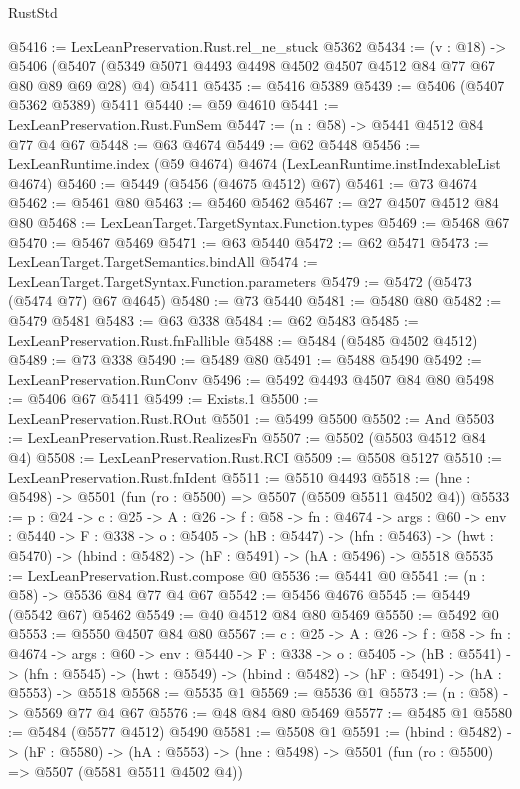 \begin{lexlean}{RustStd}
\begin{coremodule}
@5416 := LexLeanPreservation.Rust.rel_ne_stuck @5362
@5434 := (v : @18) ->
  @5406 (@5407 (@5349 @5071 @4493 @4498 @4502 @4507 @4512 @84 @77 @67 @80 @89 @69 @28) @4) @5411
@5435 := @5416 @5389
@5439 := @5406 (@5407 @5362 @5389) @5411
@5440 := @59 @4610
@5441 := LexLeanPreservation.Rust.FunSem
@5447 := (n : @58) -> @5441 @4512 @84 @77 @4 @67
@5448 := @63 @4674
@5449 := @62 @5448
@5456 := LexLeanRuntime.index (@59 @4674) @4674 (LexLeanRuntime.instIndexableList @4674)
@5460 := @5449 (@5456 (@4675 @4512) @67)
@5461 := @73 @4674
@5462 := @5461 @80
@5463 := @5460 @5462
@5467 := @27 @4507 @4512 @84 @80
@5468 := LexLeanTarget.TargetSyntax.Function.types
@5469 := @5468 @67
@5470 := @5467 @5469
@5471 := @63 @5440
@5472 := @62 @5471
@5473 := LexLeanTarget.TargetSemantics.bindAll
@5474 := LexLeanTarget.TargetSyntax.Function.parameters
@5479 := @5472 (@5473 (@5474 @77) @67 @4645)
@5480 := @73 @5440
@5481 := @5480 @80
@5482 := @5479 @5481
@5483 := @63 @338
@5484 := @62 @5483
@5485 := LexLeanPreservation.Rust.fnFallible
@5488 := @5484 (@5485 @4502 @4512)
@5489 := @73 @338
@5490 := @5489 @80
@5491 := @5488 @5490
@5492 := LexLeanPreservation.RunConv
@5496 := @5492 @4493 @4507 @84 @80
@5498 := @5406 @67 @5411
@5499 := Exists.{1}
@5500 := LexLeanPreservation.Rust.ROut
@5501 := @5499 @5500
@5502 := And
@5503 := LexLeanPreservation.Rust.RealizesFn
@5507 := @5502 (@5503 @4512 @84 @4)
@5508 := LexLeanPreservation.Rust.RCI
@5509 := @5508 @5127
@5510 := LexLeanPreservation.Rust.fnIdent
@5511 := @5510 @4493
@5518 := (hne : @5498) -> @5501 (fun (ro : @5500) => @5507 (@5509 @5511 @4502 @4))
@5533 := {p : @24} ->
  {c : @25} ->
  {A : @26} ->
  {f : @58} ->
  {fn : @4674} ->
  {args : @60} ->
  {env : @5440} ->
  {F : @338} ->
  {o : @5405} ->
  (hB : @5447) ->
  (hfn : @5463) -> (hwt : @5470) -> (hbind : @5482) -> (hF : @5491) -> (hA : @5496) -> @5518
@5535 := LexLeanPreservation.Rust.compose @0
@5536 := @5441 @0
@5541 := (n : @58) -> @5536 @84 @77 @4 @67
@5542 := @5456 @4676
@5545 := @5449 (@5542 @67) @5462
@5549 := @40 @4512 @84 @80 @5469
@5550 := @5492 @0
@5553 := @5550 @4507 @84 @80
@5567 := {c : @25} ->
  {A : @26} ->
  {f : @58} ->
  {fn : @4674} ->
  {args : @60} ->
  {env : @5440} ->
  {F : @338} ->
  {o : @5405} ->
  (hB : @5541) ->
  (hfn : @5545) -> (hwt : @5549) -> (hbind : @5482) -> (hF : @5491) -> (hA : @5553) -> @5518
@5568 := @5535 @1
@5569 := @5536 @1
@5573 := (n : @58) -> @5569 @77 @4 @67
@5576 := @48 @84 @80 @5469
@5577 := @5485 @1
@5580 := @5484 (@5577 @4512) @5490
@5581 := @5508 @1
@5591 := (hbind : @5482) ->
  (hF : @5580) ->
  (hA : @5553) -> (hne : @5498) -> @5501 (fun (ro : @5500) => @5507 (@5581 @5511 @4502 @4))

\end{coremodule}
\end{lexlean}
